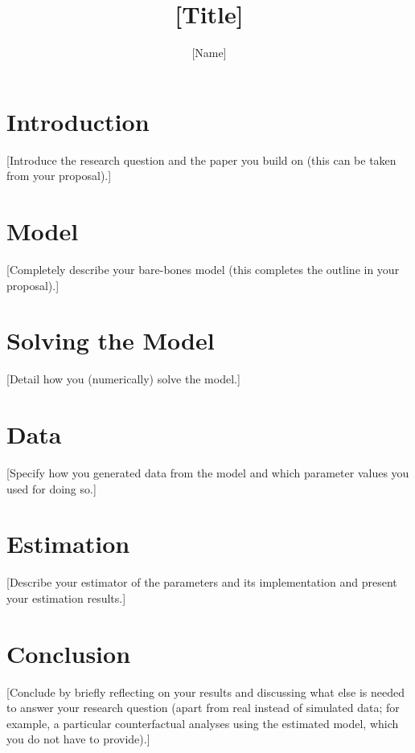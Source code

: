 \documentclass[fleqn,12pt]{article}
\title{[Title]}
\author{[Name]}
\begin{document}
\maketitle

\section{Introduction}

[Introduce the research question and the paper \citep{journalYY:authors} you build on (this can be taken from your proposal).]

\section{Model}

[Completely describe your bare-bones model (this completes the outline in your proposal).]

\section{Solving the Model}

[Detail how you (numerically) solve the model.]

\section{Data}

[Specify how you generated data from the model and which parameter values you used for doing so.]

\section{Estimation}

[Describe your estimator of the parameters and its implementation and present your estimation results.]

\section{Conclusion}

[Conclude by briefly reflecting on your results and discussing what else is needed to answer your research question (apart from real instead of simulated data; for example, a particular counterfactual analyses using the estimated model, which you do not have to provide).]




\end{document}
